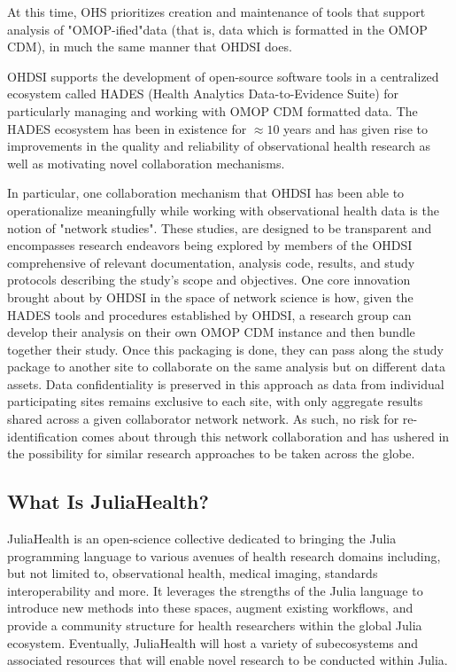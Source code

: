 \documentclass{juliacon}
\begin{document}
At this time, OHS prioritizes creation and maintenance of tools that support analysis of "OMOP-ified"\footnotemark data (that is, data which is formatted in the OMOP CDM), in much the same manner that OHDSI does.


OHDSI supports the development of open-source software tools in a centralized ecosystem called HADES (Health Analytics Data-to-Evidence Suite) for particularly managing and working with OMOP CDM formatted data.
The HADES ecosystem has been in existence for $\approx 10$ years and has given rise to improvements in the quality and reliability of observational health research as well as motivating novel collaboration mechanisms.

In particular, one collaboration mechanism that OHDSI has been able to operationalize meaningfully while working with observational health data is the notion of "network studies".
These studies, are designed to be transparent and encompasses research endeavors being explored by members of the OHDSI comprehensive of relevant documentation, analysis code, results, and study protocols describing the study's scope and objectives.
One core innovation brought about by OHDSI in the space of network science is how, given the HADES tools and procedures established by OHDSI, a research group can develop their analysis on their own OMOP CDM instance and then bundle together their study.
Once this packaging is done, they can pass along the study package to another site to collaborate on the same analysis but on different data assets.
Data confidentiality is preserved in this approach as data from individual participating sites remains exclusive to each site, with only aggregate results shared across a given collaborator network network.
As such, no risk for re-identification comes about through this network collaboration and has ushered in the possibility for similar research approaches to be taken across the globe. \cite{ohdsi2019book}

\subsection{What Is JuliaHealth?}

JuliaHealth is an open-science collective dedicated to bringing the Julia programming language to various avenues of health research domains including, but not limited to, observational health, medical imaging, standards interoperability and more.
It leverages the strengths of the Julia language to introduce new methods into these spaces, augment existing workflows, and provide a community structure for health researchers within the global Julia ecosystem.
Eventually, JuliaHealth will host a variety of subecosystems and associated resources that will enable novel research to be conducted within Julia. 
\end{document}
